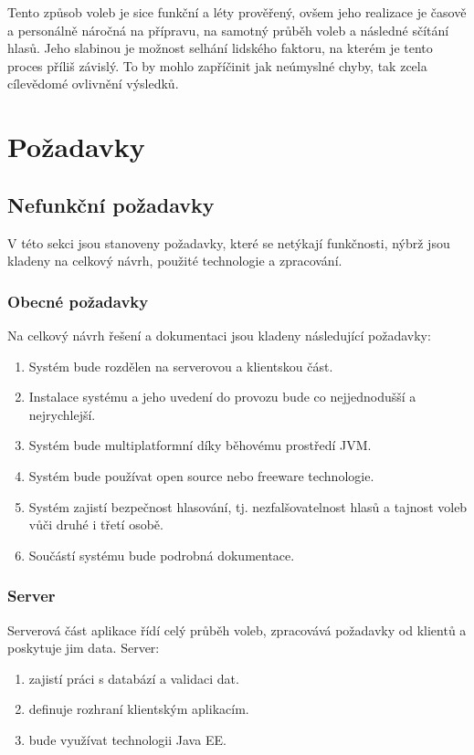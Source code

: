 \documentclass[11pt,twoside,a4paper]{book}
\begin{document}
Tento způsob voleb je sice funkční a léty prověřený, ovšem jeho realizace je časově a personálně náročná na přípravu, na samotný průběh voleb a následné sčítání hlasů. Jeho slabinou je možnost selhání lidského faktoru, na kterém je tento proces příliš závislý. To by mohlo zapříčinit jak neúmyslné chyby, tak zcela cílevědomé ovlivnění výsledků.


\section{Požadavky}

\subsection{Nefunkční požadavky}

V této sekci jsou stanoveny požadavky, které se netýkají funkčnosti, nýbrž jsou kladeny na celkový návrh, použité technologie a zpracování.

\subsubsection{Obecné požadavky}

Na celkový návrh řešení a dokumentaci jsou kladeny následující požadavky:

\begin{enumerate}
	\item Systém bude rozdělen na serverovou a klientskou část.
	\item Instalace systému a jeho uvedení do provozu bude co nejjednodušší a nejrychlejší.
	\item Systém bude multiplatformní díky běhovému prostředí JVM.
	\item Systém bude používat open source nebo freeware technologie.
	\item Systém zajistí bezpečnost hlasování, tj. nezfalšovatelnost hlasů a tajnost voleb vůči druhé i třetí osobě.
	\item Součástí systému bude podrobná dokumentace.
\end{enumerate}

\subsubsection{Server}

Serverová část aplikace řídí celý průběh voleb, zpracovává požadavky od klientů a poskytuje jim data. Server:

\begin{enumerate}
	\item zajistí práci s databází a validaci dat.
	\item definuje rozhraní klientským aplikacím.
	\item bude využívat technologii Java EE.
\end{enumerate}
\end{document}
